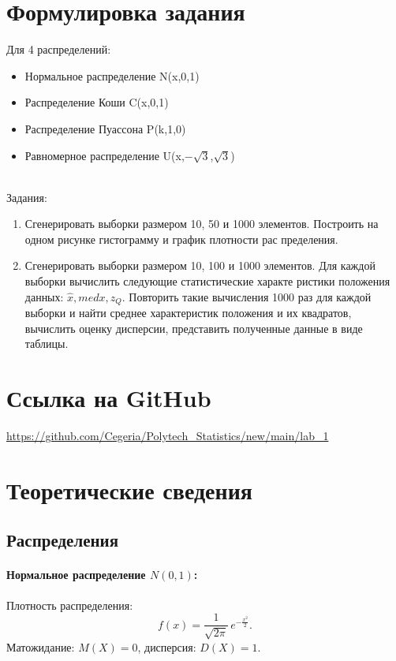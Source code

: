 \documentclass{article}
\begin{document}
\section{\Large Формулировка задания}
Для 4 распределений:
\begin{itemize}
    \item Нормальное распределение N(x,0,1)
    \item Распределение Коши C(x,0,1)
    \item Распределение Пуассона P(k,1,0)
    \item Равномерное распределение U(x,$-\sqrt{3}$,$\sqrt{3}$)
\end{itemize}
\ \\
Задания:
\begin{enumerate}
    \item  Сгенерировать выборки размером 10, 50 и 1000 элементов.
 Построить на одном рисунке гистограмму и график плотности рас
пределения.
    \item Сгенерировать выборки размером 10, 100 и 1000 элементов.
 Для каждой выборки вычислить следующие статистические характе ристики положения данных: $\hat{x}, med x, z_Q$. 
 Повторить такие вычисления 1000 раз для каждой выборки и найти среднее характеристик положения и их квадратов, вычислить оценку дисперсии, представить полученные данные в виде таблицы.
\end{enumerate}

\section{\Large Ссылка на GitHub}


\url{https://github.com/Cegeria/Polytech_Statistics/new/main/lab_1}

\section{Теоретические сведения}

\subsection{Распределения}

\paragraph{Нормальное распределение \( N(0,1) \):}
Плотность распределения:
\[
  f(x) = \frac{1}{\sqrt{2\pi}}\, e^{-\frac{x^2}{2}}.
\]
Матожидание: \( M(X)=0 \), дисперсия: \( D(X)=1 \).
\end{document}
